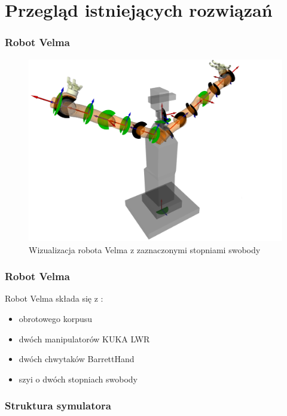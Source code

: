 \section{Przegląd istniejących rozwiązań}


\begin{frame}
\frametitle{Robot Velma}
\begin{figure}
\includegraphics[scale=0.22]{./images/velma_joints.png}
\caption{Wizualizacja robota Velma z zaznaczonymi stopniami swobody \cite{docsVelma}}
\end{figure}
\end{frame}


\begin{frame}
\frametitle{Robot Velma}
Robot Velma składa się z \cite{docsVelma}:  
\begin{itemize}
	\item obrotowego korpusu
	\item dwóch manipulatorów KUKA LWR
	\item dwóch chwytaków BarrettHand
	\item szyi o dwóch stopniach swobody
\end{itemize}
\end{frame}


\begin{frame}
\frametitle{Struktura symulatora}

\end{frame}

